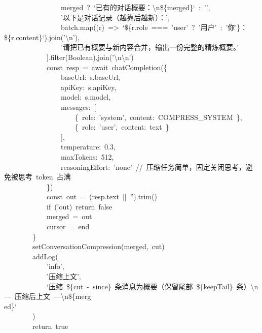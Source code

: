 \documentclass[a4paper,10pt]{article}
\begin{document}
{\ttfamily\footnotesize\raggedright
~~~~~~~~~~~~~~~~merged~?~`已有的对话概要：\textbackslash{}n\$\{merged\}`~:~'',\\
~~~~~~~~~~~~~~~~'以下是对话记录（越靠后越新）：',\\
~~~~~~~~~~~~~~~~batch.map((r)~=>~`\$\{r.role~===~'user'~?~'用户'~:~'你'\}：\$\{r.content\}`).join('\textbackslash{}n'),\\
~~~~~~~~~~~~~~~~'请把已有概要与新内容合并，输出一份完整的精炼概要。'\\
~~~~~~~~~~~~].filter(Boolean).join('\textbackslash{}n\textbackslash{}n')\\
~~~~~~~~~~~~const~resp~=~await~chatCompletion(\{\\
~~~~~~~~~~~~~~~~baseUrl:~s.baseUrl,\\
~~~~~~~~~~~~~~~~apiKey:~s.apiKey,\\
~~~~~~~~~~~~~~~~model:~s.model,\\
~~~~~~~~~~~~~~~~messages:~[\\
~~~~~~~~~~~~~~~~~~~~\{~role:~'system',~content:~COMPRESS\_SYSTEM~\},\\
~~~~~~~~~~~~~~~~~~~~\{~role:~'user',~content:~text~\}\\
~~~~~~~~~~~~~~~~],\\
~~~~~~~~~~~~~~~~temperature:~0.3,\\
~~~~~~~~~~~~~~~~maxTokens:~512,\\
~~~~~~~~~~~~~~~~reasoningEffort:~'none'~//~压缩任务简单，固定关闭思考，避免被思考~token~占满\\
~~~~~~~~~~~~\})\\
~~~~~~~~~~~~const~out~=~(resp.text~||~'').trim()\\
~~~~~~~~~~~~if~(!out)~return~false\\
~~~~~~~~~~~~merged~=~out\\
~~~~~~~~~~~~cursor~=~end\\
~~~~~~~~\}\\
~~~~~~~~setConversationCompression(merged,~cut)\\
~~~~~~~~addLog(\\
~~~~~~~~~~~~'info',\\
~~~~~~~~~~~~'压缩上文',\\
~~~~~~~~~~~~`压缩~\$\{cut~-~since\}~条消息为概要（保留尾部~\$\{keepTail\}~条）\textbackslash{}n---~压缩后上文~---\textbackslash{}n\$\{merg\\
ed\}`\\
~~~~~~~~)\\
~~~~~~~~return~true\\
}
\end{document}
